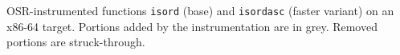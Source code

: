 \label{fig:isordx86} OSR-instrumented functions {\tt isord} (base) and {\tt isordasc} (faster variant) on an x86-64 target. Portions added by the instrumentation are in grey. Removed portions are struck-through.

